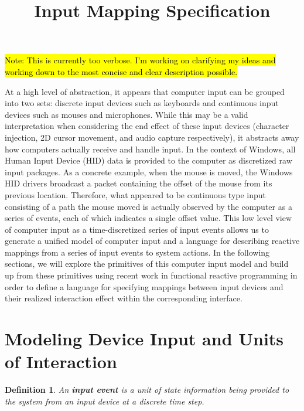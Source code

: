 \documentclass{article}
\title{Input Mapping Specification}
\newtheorem{define}{Definition}
\begin{document}
\maketitle
\thispagestyle{firststyle}

\hl{Note: This is currently too verbose. I'm working on clarifying my ideas and working down to the most concise and clear description possible.}

At a high level of abstraction, it appears that computer input can be grouped into two sets: discrete input devices such as keyboards and continuous input devices such as mouses and microphones. While this may be a valid interpretation when considering the end effect of these input devices (character injection, 2D cursor movement, and audio capture respectively), it abstracts away how computers actually receive and handle input. In the context of Windows, all Human Input Device (HID) data is provided to the computer as discretized raw input packages. As a concrete example, when the mouse is moved, the Windows HID drivers broadcast a packet containing the offset of the mouse from its previous location. Therefore, what appeared to be continuous type input consisting of a path the mouse moved is actually observed by the computer as a series of events, each of which indicates a single offset value. This low level view of computer input as a time-discretized series of input events allows us to generate a unified model of computer input and a language for describing reactive mappings from a series of input events to system actions. In the following sections, we will explore the primitives of this computer input model and build up from these primitives using recent work in functional reactive programming in order to define a language for specifying mappings between input devices and their realized interaction effect within the corresponding interface.

\section{Modeling Device Input and Units of Interaction}

\begin{define}
\label{def:event}
An \textbf{input event} is a unit of state information being provided to the system from an input device at a discrete time step.
\end{define}
\end{document}

